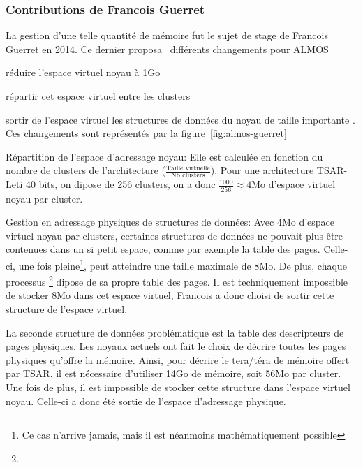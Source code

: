       
    \subsubsection{Contributions de Francois Guerret}
      
      La gestion d'une telle quantité de mémoire fut le sujet de stage de
      Francois Guerret en 2014. Ce dernier
      proposa~\cite{guerret2014exploitation} différents changements pour ALMOS
      \benumline \item réduire l'espace virtuel noyau à 1Go \item répartir cet
      espace virtuel entre les clusters \item sortir de l'espace virtuel les
      structures de données du noyau de taille importante \eenumline. Ces
      changements sont représentés par la figure~\ref{fig:almos-guerret}

      \begin{paragraph}{Répartition de l'espace d'adressage noyau:}
        Elle est calculée en fonction du nombre de clusters de l'architecture
        ($\frac{\text{Taille virtuelle}}{\text{Nb clusters}}$). Pour une
        architecture TSAR-Leti 40 bits, on dipose de 256 clusters, on a donc
        $\frac{1000}{256}\approx4$Mo d'espace virtuel noyau par cluster.
      \end{paragraph}
      \begin{paragraph}{Gestion en adressage physiques de structures de données:}
        Avec 4Mo d'espace virtuel noyau par clusters, certaines structures de
        données ne pouvait plus être contenues dans un si petit espace, comme
        par exemple la table des pages. Celle-ci, une fois pleine\footnote{Ce
          cas n'arrive jamais, mais il est néanmoins mathématiquement possible},
        peut atteindre une taille maximale de 8Mo. De plus, chaque
        processus \footnote{}  dipose de sa
        propre table des pages. Il est techniquement impossible de stocker 8Mo
        dans cet espace virtuel, Francois a donc choisi de sortir cette
        structure de l'espace virtuel.

        La seconde structure de données problématique est la table des
        descripteurs de pages physiques. Les noyaux actuels ont fait le choix de
        décrire toutes les pages physiques qu'offre la mémoire. Ainsi, pour
        décrire le tera/téra de mémoire offert par TSAR, il est nécessaire
        d'utiliser 14Go de mémoire, soit 56Mo par cluster. Une fois de plus, il
        est impossible de stocker cette structure dans l'espace virtuel
        noyau. Celle-ci a donc été sortie de l'espace d'adressage physique.
      \end{paragraph}

